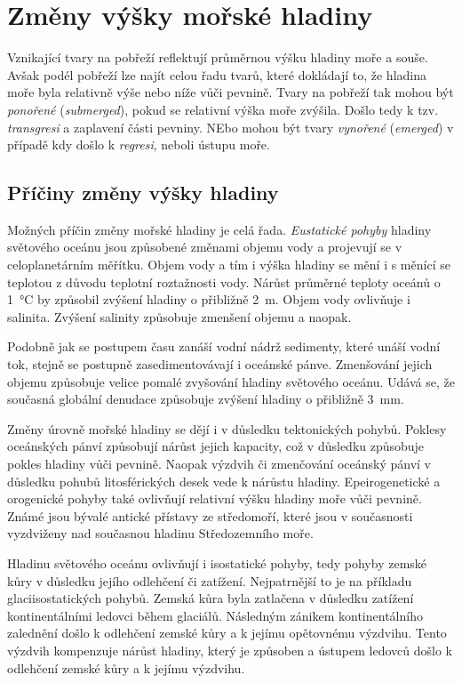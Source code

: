 \section{Změny výšky mořské hladiny}
Vznikající tvary na pobřeží reflektují průměrnou výšku hladiny moře a souše. Avšak podél pobřeží lze najít celou řadu tvarů, které dokládají to, že hladina moře byla relativně výše nebo níže vůči pevnině. Tvary na pobřeží tak mohou být \emph{ponořené} (\textit{submerged}), pokud se relativní výška moře zvýšila. Došlo tedy k tzv. \emph{transgresi} a zaplavení části pevniny. NEbo mohou být tvary \emph{vynořené} (\textit{emerged}) v případě kdy došlo k \emph{regresi}, neboli ústupu moře. 

\subsection{Příčiny změny výšky hladiny}
Možných příčin změny mořské hladiny je celá řada. \emph{Eustatické pohyby} hladiny světového oceánu jsou způsobené změnami objemu vody a projevují se v celoplanetárním měřítku. Objem vody a tím i výška hladiny se mění i s měnící se teplotou z důvodu teplotní roztažnosti vody. Nárůst průměrné teploty oceánů o \SI{1}{\celsius} by způsobil zvýšení hladiny o přibližně \SI{2}{\metre}. Objem vody ovlivňuje i salinita. Zvýšení salinity způsobuje zmenšení objemu a naopak.

Podobně jak se postupem času zanáší vodní nádrž sedimenty, které unáší vodní tok, stejně se postupně zasedimentovávají i oceánské pánve. Zmenšování jejich objemu způsobuje velice pomalé zvyšování hladiny světového oceánu. Udává se, že současná globální denudace způsobuje zvýšení hladiny o přibližně \SI{3}{\milli\metre}.

Změny úrovně mořské hladiny se dějí i v důsledku tektonických pohybů. Poklesy oceánských pánví způsobují nárůst jejich kapacity, což v důsledku způsobuje pokles hladiny vůči pevnině. Naopak výzdvih či zmenčování oceánský pánví v důsledku pohubů litosférických desek vede k nárůstu hladiny.
Epeirogenetické a orogenické pohyby také ovlivňují relativní výšku hladiny moře vůči pevnině. Známé jsou bývalé antické přístavy ze středomoří, které jsou v současnosti vyzdviženy nad současnou hladinu Středozemního moře.

Hladinu světového oceánu ovlivňují i isostatické pohyby, tedy pohyby zemské kůry v důsledku jejího odlehčení či zatížení. Nejpatrnější to je na příkladu glaciisostatických pohybů. Zemská kůra byla zatlačena v důsledku zatížení kontinentálními ledovci během glaciálů. Následným zánikem kontinentálního zalednění došlo k odlehčení zemské kůry a k jejímu opětovnému výzdvihu. Tento výzdvih kompenzuje nárůst hladiny, který je způsoben  a ústupem ledovců došlo k odlehčení zemské kůry a k jejímu výzdvihu. 

